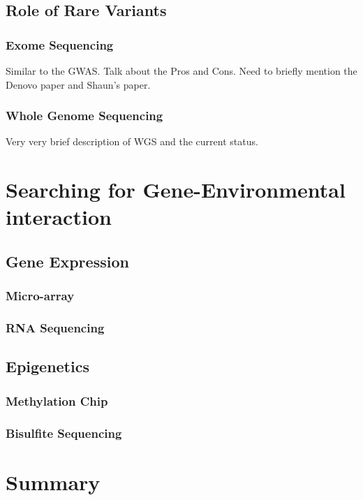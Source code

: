 \documentclass{book}
\begin{document}
			\subsection{Role of Rare Variants}
				\subsubsection{Exome Sequencing}
					Similar to the GWAS.
					Talk about the Pros and Cons.
					Need to briefly mention the Denovo paper and Shaun's paper.					
				\subsubsection{Whole Genome Sequencing}
					Very very brief description of WGS and the current status.
				
		\section{Searching for Gene-Environmental interaction}
			\subsection{Gene Expression}
				\subsubsection{Micro-array}
				\subsubsection{RNA Sequencing}
				
			\subsection{Epigenetics}
				\subsubsection{Methylation Chip}
				\subsubsection{Bisulfite Sequencing}
		\section{Summary}
	


	
\end{document}

